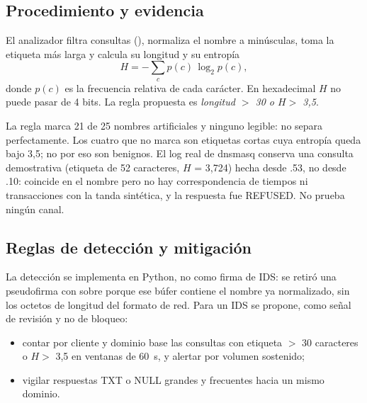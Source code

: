 \subsection{Procedimiento y evidencia}
El analizador filtra consultas (), normaliza el nombre a minúsculas, toma la etiqueta más larga y calcula su longitud y su entropía
\[ H = -\sum_{c} p(c)\,\log_2 p(c), \]
donde $p(c)$ es la frecuencia relativa de cada carácter. En hexadecimal $H$ no puede pasar de 4 bits. La regla propuesta es \emph{longitud $>$ 30 o $H >$ 3,5}.


La regla marca 21 de 25 nombres artificiales y ninguno legible: no separa perfectamente. Los cuatro que no marca son etiquetas cortas cuya entropía queda bajo 3,5; no por eso son benignos. El log real de dnsmasq conserva una consulta demostrativa (etiqueta de 52 caracteres, $H$ = 3,724) hecha desde .53, no desde .10: coincide en el nombre pero no hay correspondencia de tiempos ni transacciones con la tanda sintética, y la respuesta fue REFUSED. No prueba ningún canal.

\subsection{Reglas de detección y mitigación}
La detección se implementa en Python, no como firma de IDS: se retiró una pseudofirma con  sobre  porque ese búfer contiene el nombre ya normalizado, sin los octetos de longitud del formato de red. Para un IDS se propone, como señal de revisión y no de bloqueo:
\begin{itemize}
\item contar por cliente y dominio base las consultas con etiqueta $>$ 30 caracteres o $H >$ 3,5 en ventanas de 60~s, y alertar por volumen sostenido;
\item vigilar respuestas TXT o NULL grandes y frecuentes hacia un mismo dominio.
\end{itemize}

